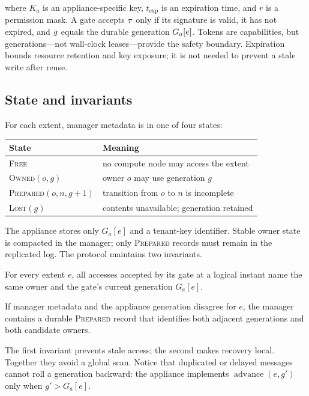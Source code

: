 where $K_a$ is an appliance-specific key, $t_{\mathrm{exp}}$ is an expiration
time, and $r$ is a permission mask. A gate accepts $\tau$ only if its signature
is valid, it has not expired, and $g$ equals the durable generation
$G_a[e]$. Tokens are capabilities, but generations---not wall-clock
leases---provide the safety boundary. Expiration bounds resource retention and
key exposure; it is not needed to prevent a stale write after reuse.

\subsection{State and invariants}

For each extent, manager metadata is in one of four states:

\begin{center}
\small
\begin{tabular}{@{}ll@{}}
\toprule
State & Meaning \\
\midrule
\textsc{Free} & no compute node may access the extent \\
\textsc{Owned}$(o,g)$ & owner $o$ may use generation $g$ \\
\textsc{Prepared}$(o,n,g{+}1)$ & transition from $o$ to $n$ is incomplete \\
\textsc{Lost}$(g)$ & contents unavailable; generation retained \\
\bottomrule
\end{tabular}
\end{center}

The appliance stores only $G_a[e]$ and a tenant-key identifier. Stable owner
state is compacted in the manager; only \textsc{Prepared} records must remain in
the replicated log. The protocol maintains two invariants.

\begin{invariant}
For every extent $e$, all accesses accepted by its gate at a logical instant
name the same owner and the gate's current generation $G_a[e]$.
\end{invariant}

\begin{invariant}
If manager metadata and the appliance generation disagree for $e$, the manager
contains a durable \textsc{Prepared} record that identifies both adjacent
generations and both candidate owners.
\end{invariant}

The first invariant prevents stale access; the second makes recovery local.
Together they avoid a global scan. Notice that duplicated or delayed messages
cannot roll a generation backward: the appliance implements
$\operatorname{advance}(e,g')$ only when $g'>G_a[e]$.

